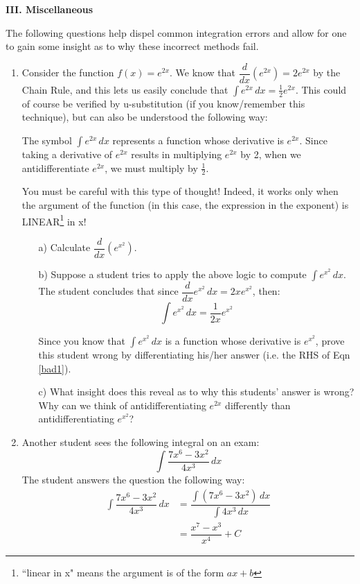 \documentclass[a4paper,12pt]{article}
\begin{document}
\textbf{III. Miscellaneous}

The following questions help dispel common integration errors and allow for one to gain some insight as to why these incorrect methods fail.
\begin{enumerate}
\item
Consider the function $f(x)=e^{2x}$.  We know that $\dfrac{d}{dx} \left( e^{2x} \right) = 2 e^{2x}$ by the Chain Rule, and this lets us easily conclude that $\int e^{2x} \, dx = \frac{1}{2} e^{2x}$.  This could of course be verified by u-substitution (if you know/remember this technique), but can also be understood the following way:

The symbol $\int e^{2x} \, dx$ represents a function whose derivative is $e^{2x}$.  Since taking a derivative of $e^{2x}$ results in multiplying $e^{2x}$ by 2, when we antidifferentiate $e^{2x}$, we must multiply by $\frac{1}{2}$.  

You must be careful with this type of thought!  Indeed, it works only when the argument of the function (in this case, the expression in the exponent) is LINEAR\footnote{``linear in x" means the argument is of the form $ax+b$} in x!

\begin{itemize}
\item[a)] Calculate $\dfrac{d}{dx} \left(e^{x^2} \right) $.
\item[b)] Suppose a student tries to apply the above logic to compute $\int e^{x^2} \, dx$.  The student concludes that since $\dfrac{d}{dx} e^{x^2} \, dx = 2x e^{x^2} $, then: 
\begin{equation}
 \int e^{x^2} \, dx = \dfrac{1}{2x} e^{x^2} \label{bad1}
\end{equation}

Since you know that $\int e^{x^2} \, dx$ is a function whose derivative is $e^{x^2}$, prove this student wrong by differentiating his/her answer (i.e. the RHS of Eqn \ref{bad1}).  

\item[c)] What insight does this reveal as to why this students' answer is wrong?  Why can we think of antidifferentiating $e^{2x}$ differently than antidifferentiating $e^{x^2}$?
\end{itemize}

\item
Another student sees the following integral on an exam:  $$\int \dfrac{7x^6-3x^2}{4x^3} \, dx$$The student answers the question the following way:
\begin{align}
\int \dfrac{7x^6-3x^2}{4x^3} \, dx &=  \dfrac{\int \left(7x^6-3x^2\right) \, dx} {\int 4x^3 \, dx} \nonumber \\
&= \dfrac{x^7-x^3}{x^4} + C \label{bad2}
\end{align}


\end{enumerate}
\end{document}
